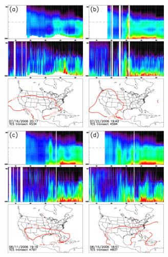 	\begin{figure}
		\begin{center}%
		\includegraphics[width=1.6in]{co/co_4534_ftuv}
		\includegraphics[width=1.6in]{co/co_4594_ftuv}
		\includegraphics[width=1.6in]{co/co_4797_ftuv}
		\includegraphics[width=1.6in]{co/co_4837_ftuv}

\end{center}
\end{figure}
